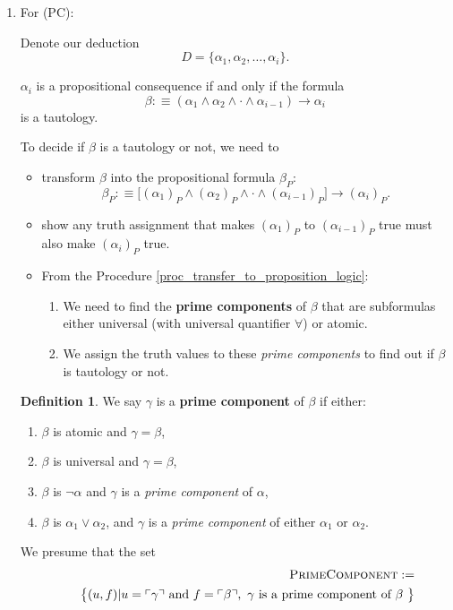 \documentclass[11pt,letterpaper]{book}
\theoremstyle{definition}
\newtheorem{definition}{Definition}[section]
\begin{document}
\begin{enumerate}
\item{For (PC):}

Denote our deduction
$$ D = \{ \alpha_1, \alpha_2, \ldots, \alpha_{i} \}. $$

$\alpha_i$ is a propositional consequence if and only if the formula
$$ \beta :\equiv (\alpha_1 \land \alpha_2 \land \cdot \land \alpha_{i-1} ) \rightarrow \alpha_i $$
is a tautology.

To decide if $\beta$ is a tautology or not, we need to
\begin{itemize}
\item{transform $\beta$ into the propositional formula $\beta_P$:
$$ \beta_P :\equiv \big[ (\alpha_1)_P \land (\alpha_2)_P \land \cdot \land (\alpha_{i-1})_P \big] \rightarrow (\alpha_i)_P .$$
}
\item{show any truth assignment that makes $(\alpha_1)_P$ to $(\alpha_{i-1})_P$ true must also make $(\alpha_i)_P$ true.
}
\item{From the Procedure \ref{proc_transfer_to_proposition_logic}: 
\begin{enumerate}
\item{We need to find the \textbf{prime components} of $\beta$ that are subformulas either universal (with universal quantifier $\forall$) or atomic.}
\item{We assign the truth values to these \emph{prime components} to find out if $\beta$ is tautology or not.}
\end{enumerate}
}
\end{itemize}

\begin{definition}
We say $\gamma$ is a \textbf{prime component} of $\beta$ if either:
\begin{enumerate}
\item{$\beta$ is atomic and $\gamma = \beta$,}
\item{$\beta$ is universal and $\gamma = \beta$,}
\item{$\beta$ is $\lnot \alpha$ and $\gamma$ is a \emph{prime component} of $\alpha$,}
\item{$\beta$ is $\alpha_1 \lor \alpha_2$, and $\gamma$ is a \emph{prime component} of either $\alpha_1$ or $\alpha_2$.}
\end{enumerate}
\end{definition}

We presume that the set
\begin{eqnarray*}
& & \text{\textsc{PrimeComponent}} := \\
& &\quad \big\{ (u, f) | u = \ulcorner \gamma \urcorner \text{ and } f = \ulcorner \beta \urcorner, \text{ $\gamma$ is a prime component of $\beta$ } \big\}
\end{eqnarray*}


\end{enumerate}
\end{document}
